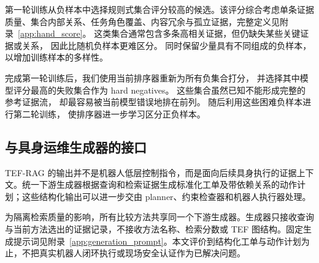 第一轮训练从负样本中选择规则式集合评分较高的候选。该评分综合考虑单条证据质量、集合内部关系、任务角色覆盖、内容冗余与孤立证据，完整定义见附录~\ref{app:hand_score}。
这类集合通常包含多条高相关证据，但仍缺失某些关键证据或关系，
因此比随机负样本更难区分。
同时保留少量具有不同组成的负样本，以增加训练样本的多样性。

完成第一轮训练后，我们使用当前排序器重新为所有负集合打分，
并选择其中模型评分最高的失败集合作为 hard negatives。
这些集合虽然已知不能形成完整的参考证据流，
却最容易被当前模型错误地排在前列。
随后利用这些困难负样本进行第二轮训练，
使排序器进一步学习区分正负样本。
\subsection{与具身运维生成器的接口}

TEF-RAG 的输出并不是机器人低层控制指令，而是面向后续具身执行的证据上下文。统一下游生成器根据查询和检索证据生成标准化工单及带依赖关系的动作计划；这些结构化输出可以进一步交由 planner、约束检查器和机器人执行器处理。

为隔离检索质量的影响，所有比较方法共享同一个下游生成器。生成器只接收查询与当前方法选出的证据记录，不接收方法名称、检索分数或 TEF 图结构。固定生成提示词见附录~\ref{app:generation_prompt}。本文评价到结构化工单与动作计划为止，不把真实机器人闭环执行或现场安全认证作为已解决问题。
